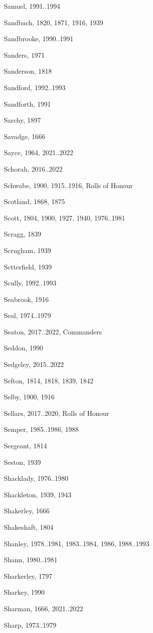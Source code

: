 {\begin{theindex}
\item Samuel, 1991..1994
\item Sandbach, 1820, 1871, 1916, 1939
\item Sandbrooke, 1990..1991
\item Sanders, 1971
\item Sanderson, 1818
\item Sandford, 1992..1993
\item Sandforth, 1991
\item Sarchy, 1897
\item Savadge, 1666
\item Sayce, 1964, 2021..2022
\item Schorah, 2016..2022
\item Schwabe, 1900, 1915..1916, Rolls of Honour
\item Scotland, 1868, 1875
\item Scott, 1804, 1900, 1927, 1940, 1976..1981
\item Scragg, 1839
\item Scrugham, 1939
\item Sctterfield, 1939
\item Scully, 1992..1993
\item Seabrook, 1916
\item Seal, 1974..1979
\item Seaton, 2017..2022, Commanders
\item Seddon, 1990
\item Sedgeley, 2015..2022
\item Sefton, 1814, 1818, 1839, 1842
\item Selby, 1900, 1916
\item Sellars, 2017..2020, Rolls of Honour
\item Semper, 1985..1986, 1988
\item Sergeant, 1814
\item Seston, 1939
\item Shacklady, 1976..1980
\item Shackleton, 1939, 1943
\item Shakerley, 1666
\item Shakeshaft, 1804
\item Shanley, 1978..1981, 1983..1984, 1986, 1988..1993
\item Shann, 1980..1981
\item Sharkerley, 1797
\item Sharkey, 1990
\item Sharman, 1666, 2021..2022
\item Sharp, 1973..1979

\end{theindex}}
